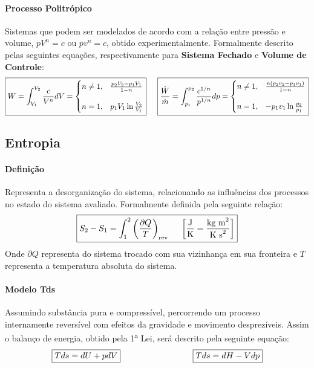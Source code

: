 \documentclass{article}
\begin{document}
            \paragraph{Processo Politrópico}Sistemas que podem ser modelados de acordo com a relação entre pressão e volume, $p V^{n} = c$ ou $p v^{n} = c$, obtido experimentalmente. Formalmente descrito pelas seguintes equações, respectivamente para \textbf{Sistema Fechado} e \textbf{Volume de Controle}:
                \[
                    \boxed{
                        W = \int_{V_{1}}^{V_{2}} \frac{c}{V^{n}} dV = 
                        \begin{cases}
                            n \neq 1, & \frac{p_{2} V_{2} - p_{1} V_{1}}{1-n}\\[4mm]
                            n = 1,    & p_{1} V_{1} \ln{\frac{V_{2}}{V_{1}}}
                        \end{cases}}
                    \hspace{5mm}
                    \boxed{
                        \frac{\dot{W}}{\dot{m}} = \int_{p_{1}}^{p_{2}} \frac{c^{1/n}}{p^{1/n}} dp = 
                        \begin{cases}
                            n \neq 1, & \frac{n(p_{2} v_{2} - p_{1} v_{1})}{1-n}\\[4mm]
                            n = 1,    & - p_{1} v_{1} \ln{\frac{p_{2}}{p_{1}}}
                        \end{cases}}
                \]

        \subsection{Entropia}
            \paragraph{Definição}Representa a desorganização do sistema, relacionando as influências dos processos no estado do sistema avaliado. Formalmente definida pela seguinte relação:
                \[\boxed{S_{2} - S_{1} = \int_{1}^{2}\left(\frac{\partial Q}{T}\right)_{\text{rev}} \hspace{5mm} \left[\frac{\text{J}}{\text{K}} = \frac{\text{kg m}^{2}}{\text{K s}^{2}}\right]}\]
            Onde $\partial Q$ representa do sistema trocado com sua vizinhança em sua fronteira e $T$ representa a temperatura absoluta do sistema.

            \paragraph{Modelo Tds}Assumindo substância pura e compressível, percorrendo um processo internamente reversível com efeitos da gravidade e movimento desprezíveis. Assim o balanço de energia, obtido pela 1\textsuperscript{a} Lei, será descrito pela seguinte equação:
                \[
                    \boxed{Tds = dU + pdV} \hspace{30mm} \boxed{Tds = dH - Vdp}
                \]
\end{document}
